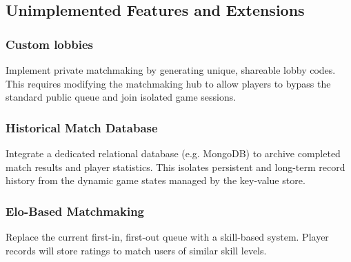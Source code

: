 \documentclass{scrartcl}
\begin{document}
\subsection{Unimplemented Features and Extensions}
\subsubsection*{Custom lobbies} Implement private matchmaking by generating unique, shareable lobby codes. This requires modifying the matchmaking hub to allow players to bypass the standard public queue and join isolated game sessions.
\subsubsection*{Historical Match Database} Integrate a dedicated relational database (e.g. MongoDB) to archive completed match results and player statistics. This isolates persistent and long-term record history from the dynamic game states managed by the key-value store.
\subsubsection*{Elo-Based Matchmaking} Replace the current first-in, first-out queue with a skill-based system. Player records will store ratings to match users of similar skill levels.

%
\end{document}
